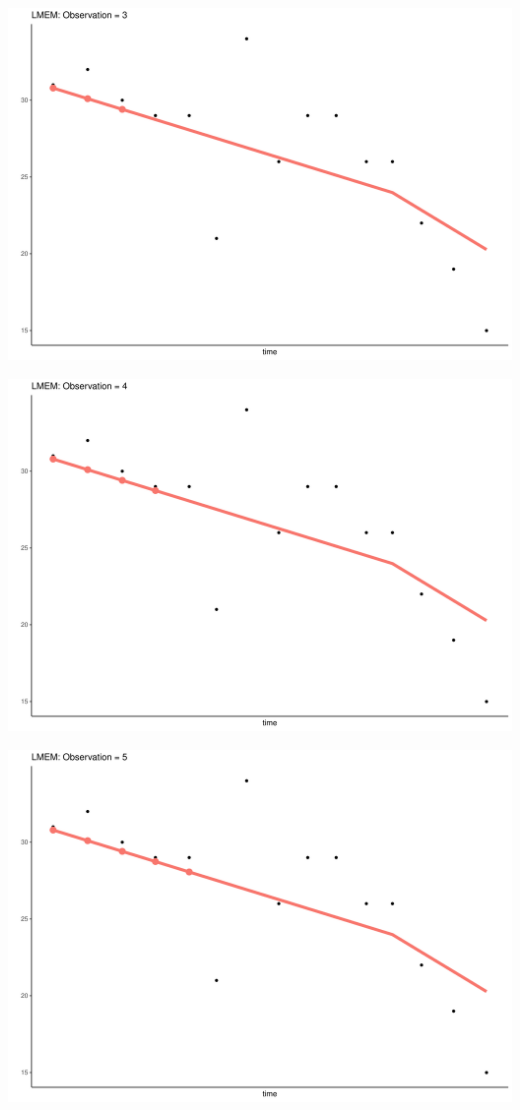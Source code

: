 \documentclass[
  ignorenonframetext,
]{beamer}
\begin{document}
\begin{frame}{}
\protect\hypertarget{section-2}{}
\includegraphics{Prez4_files/figure-beamer/unnamed-chunk-13-3.pdf}
\end{frame}

\begin{frame}{}
\protect\hypertarget{section-3}{}
\includegraphics{Prez4_files/figure-beamer/unnamed-chunk-13-4.pdf}
\end{frame}

\begin{frame}{}
\protect\hypertarget{section-4}{}
\includegraphics{Prez4_files/figure-beamer/unnamed-chunk-13-5.pdf}
\end{frame}
\end{document}
